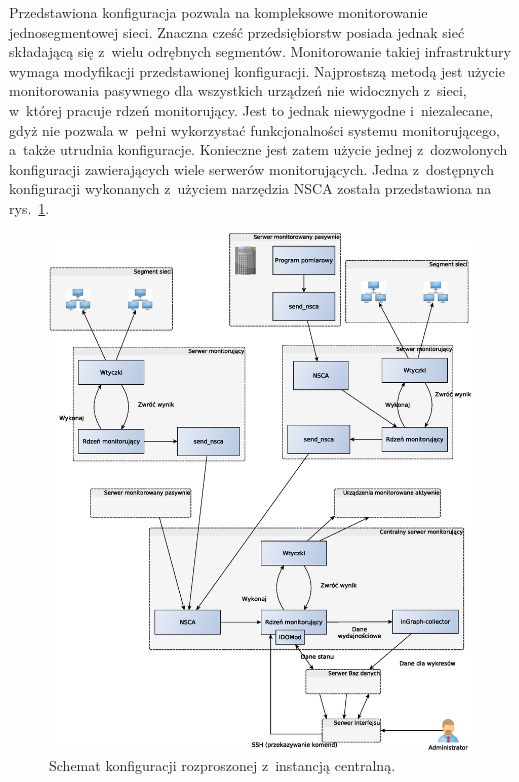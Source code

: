Przedstawiona konfiguracja pozwala na kompleksowe monitorowanie
jednosegmentowej sieci. Znaczna cześć przedsiębiorstw posiada jednak
sieć składającą się z~wielu odrębnych segmentów. Monitorowanie takiej
infrastruktury wymaga modyfikacji przedstawionej
konfiguracji. Najprostszą metodą jest użycie monitorowania pasywnego
dla wszystkich urządzeń nie widocznych z~sieci, w~której pracuje rdzeń
monitorujący. Jest to jednak niewygodne i~niezalecane, gdyż nie
pozwala w~pełni wykorzystać funkcjonalności systemu monitorującego,
a~także utrudnia konfiguracje. Konieczne jest zatem użycie jednej
z~dozwolonych konfiguracji zawierających wiele serwerów
monitorujących. Jedna z~dostępnych konfiguracji wykonanych z~użyciem
narzędzia NSCA została przedstawiona na rys.~\ref{fig:icingaNSCA}.

\begin{figure}[htpb]
  \caption{Schemat konfiguracji rozproszonej z~instancją centralną.}
  \label{fig:icingaNSCA}
\includegraphics[width=1\textwidth]{img/icingaNSCA}
\end{figure}

